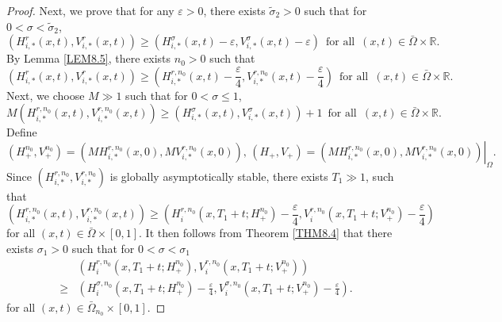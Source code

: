 \documentclass[11pt,reqno]{amsart}
\numberwithin{equation}{section}
\begin{document}
\begin{proof}
Next, we prove that for any $\varepsilon>0$, there exists $\tilde\sigma_{2}>0$ such that for $0< \sigma < \tilde\sigma_{2}$,
\begin{equation}\label{4-21}
(H_{i,*}^{r}(x,t), V_{i,*}^{r}(x,t))
\geq
(H_{i,*}^{\sigma}(x,t) - \varepsilon, V_{i,*}^{\sigma}(x,t) - \varepsilon)
\enspace \text{for all} \enspace (x,t)\in\bar{\Omega}\times\mathbb{R}.
\end{equation}
By Lemma \ref{LEM8.5}, there exists $n_{0}>0$ such that
\begin{equation}\label{4-22}
(H_{i,*}^{r}(x,t), V_{i,*}^{r}(x,t) )
\geq
\left(H_{i,*}^{r,n_{0}}(x,t) - \frac{\varepsilon}{4}, V_{i,*}^{r,n_{0}}(x,t)- \frac{\varepsilon}{4} \right)
\enspace \text{for all} \enspace (x,t)\in\bar{\Omega}\times\mathbb{R}.
\end{equation}
Next, we choose $M\gg 1$ such that for $0< \sigma \leq 1$,
\begin{equation}\label{4-23}
M\left(H_{i,*}^{r,n_{0}}(x,t), V_{i,*}^{r,n_{0}}(x,t) \right)
\geq
\left(H_{i,*}^{\sigma}(x,t) , V_{i,*}^{\sigma}(x,t) \right) + 1
\enspace \text{for all} \enspace (x,t)\in\bar{\Omega}\times\mathbb{R}.
\end{equation}
%
Define $$\left( H_{+}^{n_{0}}, V_{+}^{n_{0}} \right) = \left(MH_{i,*}^{r,n_{0}}(x,0), MV_{i,*}^{r,n_{0}}(x,0) \right),\, ( H_{+}, V_{+} ) = \left.\left(MH_{i,*}^{r,n_{0}}(x,0), MV_{i,*}^{r,n_{0}}(x,0) \right)\right|_{\Omega}.$$
%
Since $\left( H_{i,*}^{r,n_{0}}, V_{i,*}^{r,n_{0}} \right)$ is globally asymptotically stable, there exists $T_{1}\gg 1$, such that
\begin{equation}\label{4-24}
\left( H_{i,*}^{r,n_{0}}(x,t), V_{i,*}^{r,n_{0}}(x,t) \right)
\geq
\left( H_{i}^{r,n_{0}}(x,T_{1}+t;H_{+}^{n_{0}}) - \frac{\varepsilon}{4} ,
V_{i}^{r,n_{0}}(x,T_{1}+t;V_{+}^{n_{0}}) - \frac{\varepsilon}{4} \right)
\end{equation}
for all $(x,t)\in\bar{\Omega}\times [0,1]$.
%
It then follows from Theorem \ref{THM8.4} that there exists $\sigma_{1}>0$ such that for $0<\sigma<\sigma_{1}$
\begin{equation}\label{4-25}
\begin{aligned}
&\left( H_{i}^{r,n_{0}}(x,T_{1}+t;H_{+}^{n_{0}})  ,
V_{i}^{r,n_{0}}(x,T_{1}+t;V_{+}^{n_{0}}) \right)\\
\geq&
\left( H_{i}^{\sigma,n_{0}}(x,T_{1}+t;H_{+}^{n_{0}}) - \frac{\varepsilon}{4} ,
V_{i}^{\sigma,n_{0}}(x,T_{1}+t;V_{+}^{n_{0}}) - \frac{\varepsilon}{4} \right).
\end{aligned}
\end{equation}
for all $(x,t)\in\bar{\Omega}_{n_{0}} \times [0,1]$.


\end{proof}
\end{document}
